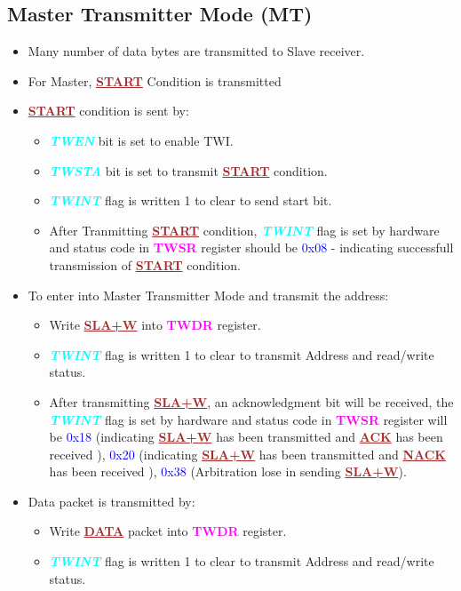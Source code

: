 \documentclass{article}
\newcommand{\bitFormat}[1]{\emph{\textbf{\textcolor{cyan}{#1}}}}
\newcommand{\regFormat}[1]{\textbf{\textcolor{magenta}{#1}}}
\newcommand{\iicFormat}[1]{\textbf{\textcolor{brown}{\underline{#1}}}}
\newcommand{\statusCode}[1]{{\textcolor{blue}{{ \LARGE #1}}}}
\begin{document}
\subsection{Master Transmitter Mode (MT)}
\begin{itemize}
    \item Many number of data bytes are transmitted to Slave receiver.
    \item For Master, \iicFormat{START} Condition is transmitted
    \item \iicFormat{START} condition is sent by:
    \begin{itemize}
        \item \bitFormat{TWEN} bit is set to enable TWI.
        \item \bitFormat{TWSTA} bit is set to transmit \iicFormat{START} condition.
        \item \bitFormat{TWINT} flag is written 1 to clear to send start bit.
        \item After Tranmitting \iicFormat{START} condition, \bitFormat{TWINT} flag is set by hardware and status code in \regFormat{TWSR} register should be \statusCode{0x08} - indicating successfull transmission of \iicFormat{START} condition.
    \end{itemize}
    \item  To enter into Master Transmitter Mode and transmit the address:
    \begin{itemize}
        \item Write \iicFormat{SLA+W} into \regFormat{TWDR} register.
        \item \bitFormat{TWINT} flag is written 1 to clear to transmit Address and read/write status.
        \item After transmitting \iicFormat{SLA+W}, an acknowledgment bit will be received, the \bitFormat{TWINT} flag is set by hardware and status code in \regFormat{TWSR} register will be \statusCode{0x18} (indicating \iicFormat{SLA+W} has been transmitted and \iicFormat{ACK} has been received ), \statusCode{0x20} (indicating \iicFormat{SLA+W} has been transmitted and \iicFormat{NACK} has been received ), \statusCode{0x38} (Arbitration lose in sending \iicFormat{SLA+W}).
    \end{itemize}
    \item Data packet is transmitted by:
    \begin{itemize}
        \item Write \iicFormat{DATA} packet into \regFormat{TWDR} register.
        \item \bitFormat{TWINT} flag is written 1 to clear to transmit Address and read/write status.

\end{itemize}
\end{itemize}
\end{document}
